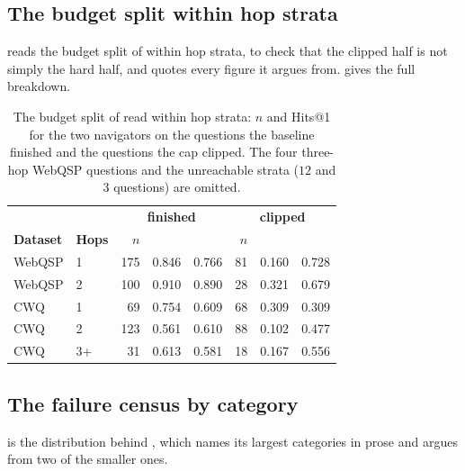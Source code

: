 \subsection{The budget split within hop strata}\label{app:strata}

 reads the budget split of  within
hop strata, to check that the clipped half is not simply the hard half,
and quotes every figure it argues from.  gives the
full breakdown.

\begin{table}[!tb]
  \begin{center}
    \caption{The budget split of  read within hop
      strata: $n$ and Hits@1 for the two navigators on the questions
      the baseline finished and the questions the cap clipped. The four
      three-hop WebQSP questions and the unreachable strata ($12$ and
      $3$ questions) are omitted.}
    \label{tab:togstrata}
    \footnotesize
    \setlength{\tabcolsep}{5pt}
    \begin{tabular}{|ll|rrr|rrr|}
      \hline
      & & \multicolumn{3}{c|}{\textbf{\tog{} finished}}
        & \multicolumn{3}{c|}{\textbf{\tog{} clipped}} \\
      \textbf{Dataset} & \textbf{Hops} & $n$ & \tog{} & \agr{}
        & $n$ & \tog{} & \agr{} \\
      \hline
      WebQSP & 1 & 175 & 0.846 & 0.766 & 81 & 0.160 & 0.728 \\
      WebQSP & 2 & 100 & 0.910 & 0.890 & 28 & 0.321 & 0.679 \\
      \hline
      CWQ & 1 & 69 & 0.754 & 0.609 & 68 & 0.309 & 0.309 \\
      CWQ & 2 & 123 & 0.561 & 0.610 & 88 & 0.102 & 0.477 \\
      CWQ & 3+ & 31 & 0.613 & 0.581 & 18 & 0.167 & 0.556 \\
      \hline
    \end{tabular}
  \end{center}
\end{table}

\subsection{The failure census by category}\label{app:census}

 is the distribution behind ,
which names its largest categories in prose and argues from two of the
smaller ones.

